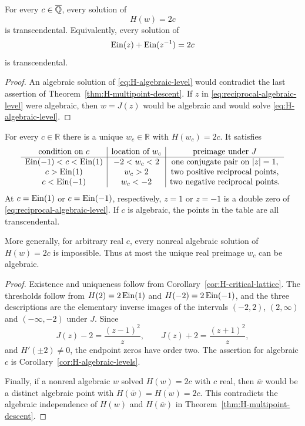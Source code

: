\begin{corollary}
\label{cor:H-algebraic-levels}
For every $c\in\overline{\mathbb Q}$, every solution of
\begin{equation}\label{eq:H-algebraic-level}
 H(w)=2c
\end{equation}
is transcendental.  Equivalently, every solution of
\begin{equation}\label{eq:reciprocal-algebraic-level}
 \operatorname{Ein}(z)+\operatorname{Ein}(z^{-1})=2c
\end{equation}
is transcendental.
\end{corollary}

\begin{proof}
An algebraic solution of \eqref{eq:H-algebraic-level} would contradict the
last assertion of Theorem~\ref{thm:H-multipoint-descent}.  If $z$ in
\eqref{eq:reciprocal-algebraic-level} were algebraic, then
$w=J(z)$ would be algebraic and would solve \eqref{eq:H-algebraic-level}.
\end{proof}

\begin{corollary}
\label{cor:H-real-levels}
For every $c\in\mathbb R$ there is a unique $w_c\in\mathbb R$ with
$H(w_c)=2c$.  It satisfies
\[
 \begin{array}{c|c|c}
 \text{condition on }c&\text{location of }w_c&
 \text{preimage under }J\\ \hline
 \operatorname{Ein}(-1)<c<\operatorname{Ein}(1)&-2<w_c<2&
 \text{one conjugate pair on }|z|=1,\\
 c>\operatorname{Ein}(1)&w_c>2&\text{two positive reciprocal points},\\
 c<\operatorname{Ein}(-1)&w_c<-2&\text{two negative reciprocal points}.
 \end{array}
\]
At $c=\operatorname{Ein}(1)$ or $c=\operatorname{Ein}(-1)$, respectively, $z=1$ or $z=-1$ is a
double zero of \eqref{eq:reciprocal-algebraic-level}.  If $c$ is algebraic,
the points in the table are all transcendental.

More generally, for arbitrary real $c$, every nonreal algebraic solution
of $H(w)=2c$ is impossible.  Thus at most the unique real preimage $w_c$
can be algebraic.
\end{corollary}

\begin{proof}
Existence and uniqueness follow from Corollary~\ref{cor:H-critical-lattice}.
The thresholds follow from
$H(2)=2\operatorname{Ein}(1)$ and $H(-2)=2\operatorname{Ein}(-1)$, and the three descriptions are the
elementary inverse images of the intervals $(-2,2)$, $(2,\infty)$ and
$(-\infty,-2)$ under $J$.  Since
\[
 J(z)-2=\frac{(z-1)^2}{z},\qquad
 J(z)+2=\frac{(z+1)^2}{z},
\]
and $H'(\pm2)\ne0$, the endpoint zeros have order two.  The assertion for
algebraic $c$ is Corollary~\ref{cor:H-algebraic-levels}.

Finally, if a nonreal algebraic $w$ solved $H(w)=2c$ with $c$ real, then
$\bar w$ would be a distinct algebraic point with
$H(\bar w)=\overline{H(w)}=2c$.  This contradicts the algebraic
independence of $H(w)$ and $H(\bar w)$ in
Theorem~\ref{thm:H-multipoint-descent}.
\end{proof}

